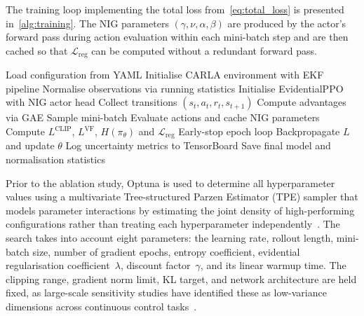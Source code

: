 \documentclass{sig-alternate}
\begin{document}
The training loop implementing the total loss from~\cref{eq:total_loss} is presented in~\cref{alg:training}. The NIG parameters $(\gamma, \nu, \alpha, \beta)$ are produced by the actor's forward pass during action evaluation within each mini-batch step and are then cached so that $\mathcal{L}_{\text{reg}}$ can be computed without a redundant forward pass. 
\begin{algorithm}[htbp]
    \caption{Evidential PPO training loop.\label{alg:training}}
    \begin{algorithmic}[1]
        \State Load configuration from YAML
        \State Initialise CARLA environment with EKF pipeline
        \State Normalise observations via running statistics
        \State Initialise EvidentialPPO with NIG actor head
            \State Collect transitions $(s_t, a_t, r_t, s_{t+1})$
            \State Compute advantages via GAE
                \State Sample mini-batch
                \State Evaluate actions and cache NIG parameters 
                \State Compute $L^{\text{CLIP}}$, $L^{\text{VF}}$, $H(\pi_\theta)$ and $\mathcal{L}_{\text{reg}}$
                    \State Early-stop epoch loop
                \EndIf
                \State Backpropagate $L$ and update $\theta$
            \EndFor
            \State Log uncertainty metrics to TensorBoard
        \EndFor
        \State Save final model and normalisation statistics
    \end{algorithmic}
\end{algorithm}


Prior to the ablation study, Optuna is used to determine all hyperparameter values using a multivariate Tree-structured Parzen Estimator (TPE) sampler that models parameter interactions by estimating the joint density of high-performing configurations rather than treating each hyperparameter  independently~\cite{akiba2019optuna}. The search takes into account eight parameters: the learning rate, rollout length, mini-batch size, number of gradient epochs, entropy coefficient, evidential regularisation coefficient~$\lambda$, discount factor~$\gamma$, and its linear warmup time. The clipping range, gradient norm limit, KL target, and network architecture are held fixed, as large-scale sensitivity studies have identified these as low-variance dimensions across continuous control tasks~\cite{andrychowicz2021onpolicy}.
\end{document}
